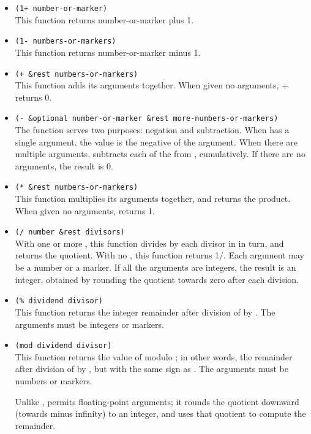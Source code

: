 \begin{itemize}[itemsep=10pt]
\item \lstinline|(1+ number-or-marker)|\\
  This function returns number-or-marker plus 1. 
\item \lstinline|(1- numbers-or-markers)|\\
  This function returns number-or-marker minus 1.
\item \lstinline|(+ &rest numbers-or-markers)|\\
  This function adds its arguments together. When given no arguments, + returns 0.
\item \lstinline|(- &optional number-or-marker &rest more-numbers-or-markers)|\\
  The \argument{-} function serves two purposes: negation and subtraction.
  When \argument{-} has a single argument, the value is the negative of the argument.
  When there are multiple arguments, \argument{-} subtracts each of the  from , cumulatively.
  If there are no arguments, the result is 0.
\item \lstinline|(* &rest numbers-or-markers)|\\
  This function multiplies its arguments together, and returns the product.
  When given no arguments, \argument{*} returns 1.
\item \lstinline|(/ number &rest divisors)|\\
  With one or more , this function divides  by each divisor in  in turn, and returns the quotient.
  With no , this function returns 1/.
  Each argument may be a number or a marker.
  If all the arguments are integers, the result is an integer, obtained by rounding the quotient towards zero after each division.
\item \lstinline|(% dividend divisor)|\\
  This function returns the integer remainder after division of  by .
  The arguments must be integers or markers.
\item \lstinline|(mod dividend divisor)|\\
  This function returns the value of  modulo ; in other words, the remainder after division of  by , but with the same sign as .
  The arguments must be numbers or markers.
  
  Unlike \argument{\%},  permits floating-point arguments; it rounds the quotient downward (towards minus infinity) to an integer, and uses that quotient to compute the remainder.
  

\end{itemize}

